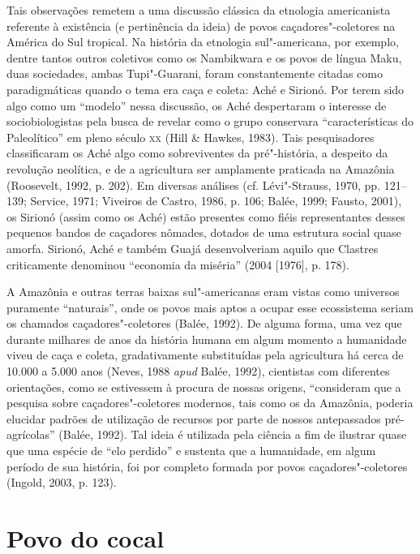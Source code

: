 Tais observações remetem a uma discussão clássica da etnologia
americanista referente à existência (e pertinência da ideia) de povos
caçadores"-coletores na América do Sul tropical. Na história da etnologia
sul"-americana, por exemplo, dentre tantos outros coletivos como os
Nambikwara e os povos de língua Maku, duas sociedades, ambas
Tupi"-Guarani, foram constantemente citadas como paradigmáticas quando o
tema era caça e coleta: Aché e Sirionó. Por terem sido algo como um
``modelo'' nessa discussão, os Aché despertaram o interesse de
sociobiologistas pela busca de revelar como o grupo conservara
``características do Paleolítico'' em pleno século \textsc{xx} (Hill \& Hawkes,
1983). Tais pesquisadores classificaram os Aché algo como sobreviventes
da pré"-história, a despeito da revolução neolítica, e de a agricultura
ser amplamente praticada na Amazônia (Roosevelt, 1992, p. 202). Em diversas
análises (cf. Lévi"-Strauss, 1970, pp. 121--139; Service, 1971; Viveiros de
Castro, 1986, p. 106; Balée, 1999; Fausto, 2001), os Sirionó (assim como os
Aché) estão presentes como fiéis representantes desses pequenos bandos
de caçadores nômades, dotados de uma estrutura social quase amorfa.
Sirionó, Aché e também Guajá desenvolveriam aquilo que Clastres
criticamente denominou ``economia da miséria'' (2004 {[}1976{]}, p. 178).

A Amazônia e outras terras baixas sul"-americanas eram vistas como
universos puramente ``naturais'', onde os povos mais aptos a ocupar esse
ecossistema seriam os chamados caçadores"-coletores (Balée, 1992). De
alguma forma, uma vez que durante milhares de anos da história humana em
algum momento a humanidade viveu de caça e coleta, gradativamente
substituídas pela agricultura há cerca de 10.000 a 5.000 anos (Neves,
1988 \emph{apud} Balée, 1992), cientistas com diferentes orientações, como se
estivessem à procura de nossas origens, ``consideram que a pesquisa
sobre caçadores"-coletores modernos, tais como os da Amazônia, poderia
elucidar padrões de utilização de recursos por parte de nossos
antepassados pré-agrícolas'' (Balée, 1992). Tal ideia é utilizada pela
ciência a fim de ilustrar quase que uma espécie de ``elo perdido'' e
sustenta que a humanidade, em algum período de sua história, foi por
completo formada por povos caçadores"-coletores (Ingold, 2003, p. 123).

\section{Povo do cocal}

